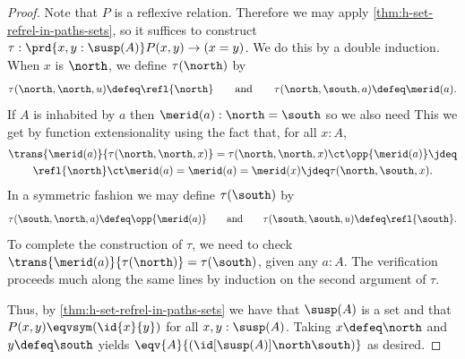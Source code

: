 \begin{proof}
Note that $P$ is a reflexive relation.
Therefore we may apply \cref{thm:h-set-refrel-in-paths-sets}, so it suffices to
construct $\tau : \prd{x,y:\susp(A)}P(x,y)\to(x=y)$. We do this by a double induction.
When $x$ is $\north$, we define $\tau(\north)$ by
%
\begin{equation*}
  \tau(\north,\north,u) \defeq \refl{\north}
  \qquad\text{and}\qquad
  \tau(\north,\south,a) \defeq \merid(a).
\end{equation*}
%
If $A$ is inhabited by $a$ then $\merid(a) : \north = \south$ so we also need
This we get by function extensionality using the fact that, for all $x : A$,
%
\begin{multline*}
  \trans{\merid(a)}{\tau(\north,\north,x)} =
  \tau(\north,\north,x) \ct \opp{\merid(a)} \jdeq \\
  \refl{\north} \ct \merid(a) =
  \merid(a) =
  \merid(x) \jdeq
  \tau(\north, \south, x).
\end{multline*}
In a symmetric fashion we may define $\tau(\south)$ by
%
\begin{equation*}
  \tau(\south,\north, a) \defeq \opp{\merid(a)}
  \qquad\text{and}\qquad
  \tau(\south,\south, u) \defeq \refl{\south}.
\end{equation*}
%
To complete the construction of $\tau$, we need to check $\trans{\merid(a)}{\tau(\north)} = \tau(\south)$,
given any $a : A$. The verification proceeds much along the same lines by induction on the
second argument of $\tau$.

Thus, by \cref{thm:h-set-refrel-in-paths-sets} we have that $\susp(A)$ is a set and that $P(x,y) \eqvsym (\id{x}{y})$ for all $x,y:\susp(A)$.
Taking $x\defeq \north$ and $y\defeq \south$ yields $\eqv{A}{(\id[\susp(A)]\north\south)}$ as desired.
\end{proof}
